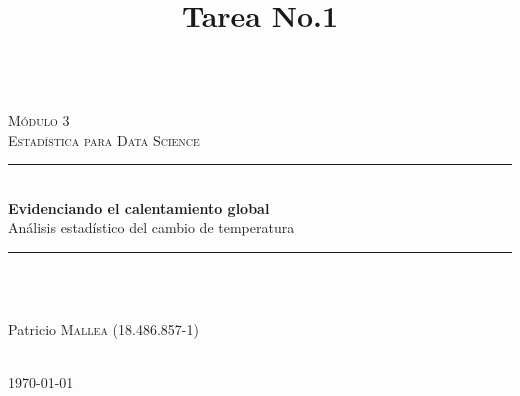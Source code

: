 \documentclass[12pt]{article}
\title{Tarea No.1}
\begin{document}
\renewcommand{\listfigurename}{Índice de Figuras}
\renewcommand{\listtablename}{Índice de Tablas}
\renewcommand{\tablename}{Tabla}

\begin{titlepage}

\newcommand{\HRule}{\rule{\linewidth}{0.2mm}} %

\center %
 

\thispagestyle{firstpage}

\textsc{\LARGE }\\[3cm]
\textsc{\Large Módulo 3}\\[0.5cm] %
\textsc{\large Estadística para Data Science}\\[1.5cm] %


\HRule \\[0.7cm]
{ \huge \bfseries Evidenciando el calentamiento global}\\[0.2cm]
{\large Análisis estadístico del cambio de temperatura}\\[0.4cm]%
\HRule \\[5.5cm]
 
\flushleft
\begin{minipage}{0.6\textwidth}
\begin{flushleft} \large
\textbf{}\\
\hskip 1cm Patricio \textsc{Mallea} (18.486.857-1)\\
\end{flushleft}

\end{minipage}\\[4cm]


\center 
{\large \today}\\[2cm] %

\vfill %
\end{titlepage}
\end{document}
